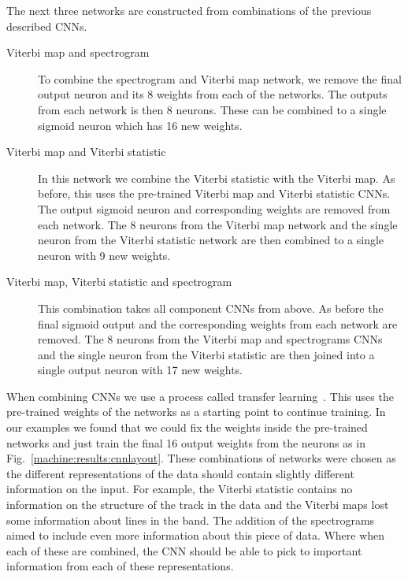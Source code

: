 The next three networks are constructed from combinations of the previous described \acp{CNN}.

\begin{description}
	\item [Viterbi map and spectrogram] To combine the spectrogram and Viterbi map network, we remove the final output neuron and its 8 weights from each of the networks. 
	The outputs from each network is then 8 neurons. These can be combined to a single sigmoid neuron which has 16 new weights.
	
	\item [Viterbi map and Viterbi statistic] In this network we combine the
	Viterbi statistic with the Viterbi map. As before, this uses the pre-trained
	Viterbi map and Viterbi statistic \acp{CNN}. The output sigmoid neuron and corresponding weights are removed from each network. 
	The 8 neurons from the Viterbi map network and the single neuron from the Viterbi statistic network are then combined to a single neuron with 9 new weights.
	
	\item [Viterbi map, Viterbi statistic and spectrogram] This combination takes all component \acp{CNN} from above. As before the final sigmoid output and the corresponding weights from each network are removed.
	The 8 neurons from the Viterbi map and spectrograms \acp{CNN} and the single neuron from the Viterbi statistic are then joined into a single output neuron with 17 new weights. 
	
\end{description}

When combining \acp{CNN} we use a process called transfer
learning~\cite{prattDiscriminabilityBasedTransfer}. This uses the pre-trained weights of the networks as a starting point to continue training. 
In our examples we found that we could fix the weights inside the pre-trained networks and just train the final 16 output weights from the neurons as in Fig.~\ref{machine:results:cnnlayout}.
These combinations of networks were chosen as the different representations of the data should contain slightly different information on the input.
For example, the Viterbi statistic contains no information on the structure of the track in the data and the Viterbi maps lost some information about lines in the band.
The addition of the spectrograms aimed to include even more information about this piece of data. 
Where when each of these are combined, the \ac{CNN} should be able to pick to important information from each of these representations.

